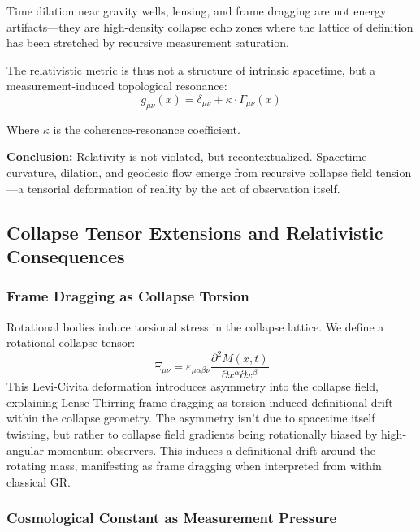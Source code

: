 Time dilation near gravity wells, lensing, and frame dragging are not energy artifacts---they are high-density collapse echo zones where the lattice of definition has been stretched by recursive measurement saturation.

The relativistic metric is thus not a structure of intrinsic spacetime, but a 
measurement-induced topological resonance:
\[
g_{\mu\nu}(x) = \delta_{\mu\nu} + \kappa \cdot \Gamma_{\mu\nu}(x)
\]

Where \( \kappa \) is the coherence-resonance coefficient.

\textbf{Conclusion:} Relativity is not violated, but recontextualized. Spacetime curvature, dilation, and geodesic flow emerge from recursive collapse field tension---a tensorial deformation of reality by the act of observation itself.

\subsection{Collapse Tensor Extensions and Relativistic Consequences} \cite{emergent_field_core, entanglement_structure, quantum_thermo_laws, thermalization_dynamics, blackhole_collapse_links}

\subsubsection{Frame Dragging as Collapse Torsion} \cite{emergent_field_core, entanglement_structure, quantum_thermo_laws, thermalization_dynamics, blackhole_collapse_links}

Rotational bodies induce torsional stress in the collapse lattice. We define a rotational collapse tensor:
\[
\Xi_{\mu\nu} = \varepsilon_{\mu\alpha\beta\nu} \frac{\partial^2 M(x, t)}{\partial x^\alpha \partial x^\beta}
\]
This Levi-Civita deformation introduces asymmetry into the collapse field, explaining Lense-Thirring frame dragging as  torsion-induced definitional drift  within the collapse geometry. 
The asymmetry isn't due to spacetime itself twisting, but rather to collapse field gradients being rotationally biased by high-angular-momentum observers. 
This induces a definitional drift around the rotating mass, manifesting as frame dragging when interpreted from within classical GR.

\subsubsection{Cosmological Constant as Measurement Pressure} \cite{emergent_field_core, entanglement_structure, quantum_thermo_laws, thermalization_dynamics, blackhole_collapse_links}

